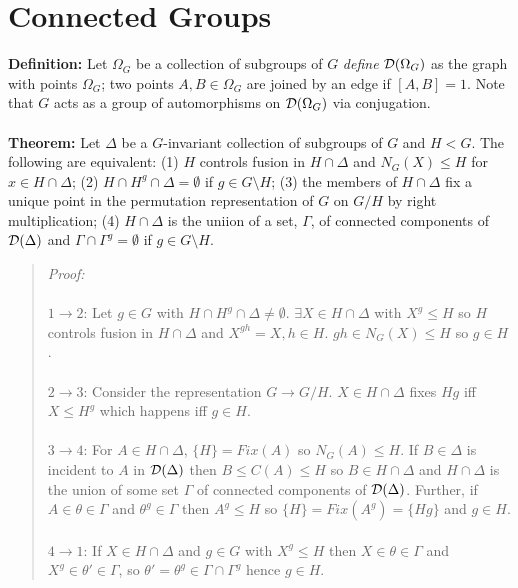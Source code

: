 \section{Connected Groups}
{\bf Definition:}  Let $\Omega_G$ be a collection of subgroups of $G$ \emph{define}
${\cal D}(\Omega_G)$ as the graph with points $\Omega_G$; two points
$A,B \in \Omega_G$ are joined by an edge if $[A,B]=1$.  Note that $G$ acts as a
group of automorphisms on ${\cal D}(\Omega_G)$ via conjugation.
\\
\\
{\bf Theorem:} Let $\Delta$ be a $G$-invariant collection of subgroups of $G$ and $H < G$.
The following are equivalent:
(1) $H$ controls fusion in $H \cap \Delta$ and $N_G(X) \le H$ for $x \in H \cap \Delta$;
(2) $H \cap H^g \cap \Delta= \emptyset$ if $g \in G \setminus H$;
(3) the members of $H \cap \Delta$ fix a unique point in the permutation representation
of $G$ on $G/H$ by right multiplication;
(4) $H \cap \Delta$ is the uniion of a set, $\Gamma$, of connected components of
${\cal D}(\Delta)$ and $\Gamma \cap \Gamma^g= \emptyset$ if $g \in G \setminus H$.
\begin{quote}
\emph{Proof:}  \\
\\
$1 \rightarrow 2$:
Let $g \in G$ with $H \cap H^g \cap \Delta \ne \emptyset$.  $\exists X \in H \cap \Delta$
with $X^g \le H$ so $H$ controls fusion in $H \cap \Delta$ and
$X^{gh}=X, h \in H$.  $gh \in N_G(X) \le H$ so $g \in H$.
\\
\\
$2 \rightarrow 3$:
Consider the representation $G \rightarrow G/H$.  $X \in H \cap \Delta$ fixes
$Hg$ iff $X \le H^g$ which happens iff $g \in H$.
\\
\\
$3 \rightarrow 4$:
For $A \in H \cap \Delta$, $\{ H \} = Fix(A)$ so $N_G(A) \le H$.  If $B \in \Delta$ is incident
to $A$ in ${\cal D}(\Delta)$ then $B \le C(A) \le H$ so $B \in H \cap \Delta$ and
$H \cap \Delta$ is the union of some set $\Gamma$ of connected components of ${\cal D}( \Delta )$.
Further, if $A \in \theta \in \Gamma$ and $\theta^g \in \Gamma$ then
$A^g \le H$ so $\{ H \} = Fix(A^g ) = \{ Hg \}$ and $g \in H$.
\\
\\
$4 \rightarrow 1$:
If $X \in H \cap \Delta$ and $g \in G$ with $X^g \le H$ then $X \in \theta \in \Gamma$ and
$X^g \in \theta' \in \Gamma$, so $\theta' = \theta^g \in \Gamma \cap \Gamma^g$ hence
$g \in H$.
\end{quote}

